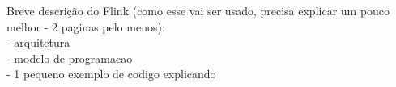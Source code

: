Breve descrição do Flink (como esse vai ser usado, precisa explicar um pouco melhor - 2 paginas pelo menos):\\
- arquitetura\\
- modelo de programacao\\
- 1 pequeno exemplo de codigo explicando

\cite{Lopez2018}








